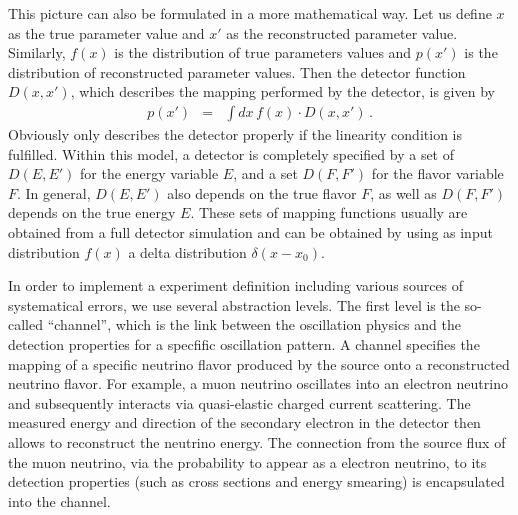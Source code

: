 This picture can also be formulated in a more mathematical way. Let us define $x$ as the true parameter value and $x'$ as the reconstructed parameter value. Similarly, $f(x)$ is the distribution of true parameters values and $p(x')$ is the distribution of reconstructed parameter values. Then the detector function  $D(x,x')$, which describes the mapping performed by the detector, is given by
\begin{eqnarray}
\label{equ:mapping}
p(x')&=&\int dx\, f(x)\cdot D(x,x')\,.
\end{eqnarray}
Obviously  only describes the detector properly
if the linearity condition is fulfilled. Within this model, a detector
is completely specified by a set of $D(E,E')$ for the energy variable $E$,
and a set $D(F,F')$ for the flavor variable $F$. In general, $D(E,E')$ also depends on the true flavor $F$, as well as $D(F,F')$ depends on the true energy $E$. These sets of mapping functions usually are obtained from a 
full detector simulation and can be obtained by using as input 
distribution $f(x)$ a delta distribution $\delta(x-x_0)$.

In order to implement a experiment definition including various
sources of systematical errors, we use several abstraction levels. 
The first level is the so-called ``channel'', which is the link between 
the oscillation physics and the detection properties for a specfific oscillation pattern. A channel specifies the mapping of a specific neutrino flavor produced by the source onto a reconstructed neutrino flavor.
For example, a muon neutrino oscillates into an electron neutrino and subsequently interacts via quasi-elastic charged current scattering. The measured energy and direction of
the secondary electron in the detector then allows to reconstruct the neutrino energy. The connection from the source flux of the muon neutrino, via the  probability to appear as a electron neutrino, to its detection properties (such as cross sections and energy smearing) is encapsulated into the channel.

